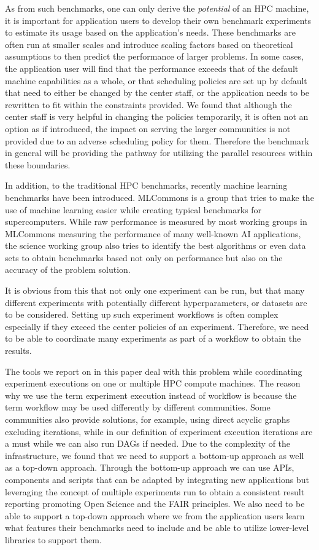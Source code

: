 \documentclass[utf8]{FrontiersinVancouver} %
\begin{document}
As from such benchmarks, one can only derive the {\em potential} of an HPC machine, it is important for application users to develop their own benchmark experiments to estimate its usage based on the application's needs. These benchmarks are often run at smaller scales and introduce scaling factors based on theoretical assumptions to then predict the performance of larger problems. In some cases, the application user will find that the performance exceeds that of the default machine capabilities as a whole, or that scheduling policies are set up by default that need to either be changed by the center staff, or the application needs to be rewritten to fit within the constraints provided. We found that although the center staff is very helpful in changing the policies temporarily, it is often not an option as if introduced, the impact on serving the larger communities is not provided due to an adverse scheduling policy for them. Therefore the benchmark in general will be providing the pathway for utilizing the parallel resources within these boundaries.

In addition, to the traditional HPC benchmarks, recently machine learning benchmarks have been introduced. MLCommons is a group that tries to make the use of machine learning easier while creating typical benchmarks for supercomputers. While raw performance is measured by most working groups in MLCommons measuring the performance of many well-known AI applications, the science working group also tries to identify the best algorithms or even data sets to obtain benchmarks based not only on performance but also on the accuracy of the problem solution.

It is obvious from this that not only one experiment can be run, but that many different experiments with potentially different hyperparameters, or datasets are to be considered. Setting up such experiment workflows is often complex especially if they exceed the center policies of an experiment. Therefore, we need to be able to coordinate many experiments as part of a workflow to obtain the results.

The tools we report on in this paper deal with this problem while coordinating experiment executions on one or multiple HPC compute machines.
The reason why we use the term experiment execution instead of workflow is because the term workflow may be used differently by different communities. Some communities also provide solutions, for example, using direct acyclic graphs excluding iterations, while in our definition of experiment execution iterations are a must while we can also run DAGs if needed. 
Due to the complexity of the infrastructure, we found that we need to support a bottom-up approach as well as a top-down approach.
Through the bottom-up approach we can use APIs, components and scripts that can be adapted by integrating new applications but leveraging the concept of multiple experiments run to obtain a consistent result reporting promoting Open Science and the FAIR principles.
We also need to be able to support a top-down approach where we from the application users learn what features their benchmarks need to include and be able to utilize lower-level libraries to support them.
\end{document}
